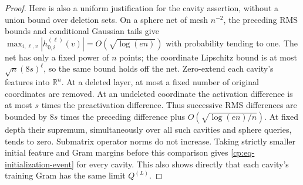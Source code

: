 \begin{proof}
Here is also a uniform justification for the cavity assertion, without
a union bound over deletion sets.  On a sphere net of mesh $n^{-2}$,
the preceding RMS bounds and conditional Gaussian tails give
$\max_{i,\ell,v}|h_{0,i}^{(\ell)}(v)|=O(\sqrt{\log(en)})$
with probability tending to one.  The net has only a fixed power of $n$
points; the coordinate Lipschitz bound is at most
$\sqrt n(8s)^\ell$, so the same bound holds off the net.  Zero-extend
each cavity's features into $\mathbb R^n$.  At a deleted layer, at most
a fixed number of original coordinates are removed.  At an undeleted
coordinate the activation difference is at most $s$ times the
preactivation difference.  Thus successive RMS differences are bounded
by $8s$ times the preceding difference plus
$O(\sqrt{\log(en)/n})$.  At fixed depth their supremum, simultaneously
over all such cavities and sphere queries, tends to zero.  Submatrix
operator norms do not increase.  Taking strictly smaller initial
feature and Gram margins before this comparison gives
\eqref{cp:eq-initialization-event} for every cavity.  This also shows
directly that each cavity's training Gram has the same limit $Q^{(L)}$.


\end{proof}
